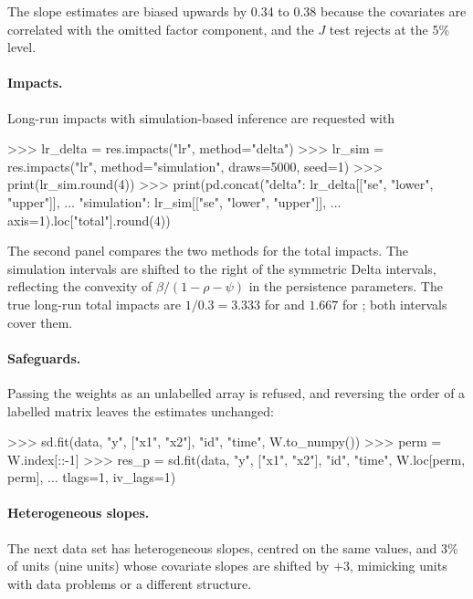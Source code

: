 \documentclass[article]{jss}
\begin{document}
The slope estimates are biased upwards by 0.34 to 0.38 because the
covariates are correlated with the omitted factor component, and the $J$
test rejects at the 5\% level.

\paragraph{Impacts.} Long-run impacts with simulation-based inference are
requested with

\begin{CodeInput}
>>> lr_delta = res.impacts("lr", method="delta")
>>> lr_sim = res.impacts("lr", method="simulation", draws=5000, seed=1)
>>> print(lr_sim.round(4))
>>> print(pd.concat({"delta": lr_delta[["se", "lower", "upper"]],
...                  "simulation": lr_sim[["se", "lower", "upper"]]},
...                 axis=1).loc["total"].round(4))
\end{CodeInput}

The second panel compares the two methods for the total impacts. The
simulation intervals are shifted to the right of the symmetric Delta
intervals, reflecting the convexity of $\beta/(1-\rho-\psi)$ in the
persistence parameters. The true long-run total impacts are $1/0.3=3.333$
for  and $1.667$ for ; both intervals cover them.

\paragraph{Safeguards.} Passing the weights as an unlabelled array is
refused, and reversing the order of a labelled matrix leaves the estimates
unchanged:

\begin{CodeInput}
>>> sd.fit(data, "y", ["x1", "x2"], "id", "time", W.to_numpy())
>>> perm = W.index[::-1]
>>> res_p = sd.fit(data, "y", ["x1", "x2"], "id", "time", W.loc[perm, perm],
...                tlags=1, iv_lags=1)
\end{CodeInput}

\paragraph{Heterogeneous slopes.} The next data set has heterogeneous
slopes, centred on the same values, and 3\% of units (nine units) whose
covariate slopes are shifted by $+3$, mimicking units with data problems or
a different structure.
\end{document}
